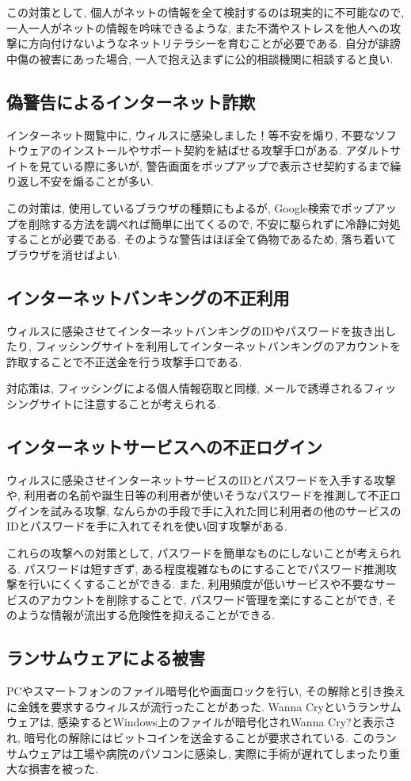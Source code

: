 \documentclass{jsarticle}
\begin{document}
この対策として, 個人がネットの情報を全て検討するのは現実的に不可能なので, 一人一人がネットの情報を吟味できるような, また不満やストレスを他人への攻撃に方向付けないようなネットリテラシーを育むことが必要である. 自分が誹謗中傷の被害にあった場合, 一人で抱え込まずに公的相談機関に相談すると良い.

\subsection{偽警告によるインターネット詐欺}
インターネット閲覧中に, ウィルスに感染しました！等不安を煽り, 不要なソフトウェアのインストールやサポート契約を結ばせる攻撃手口がある. アダルトサイトを見ている際に多いが, 警告画面をポップアップで表示させ契約するまで繰り返し不安を煽ることが多い.

この対策は, 使用しているブラウザの種類にもよるが, Google検索でポップアップを削除する方法を調べれば簡単に出てくるので, 不安に駆られずに冷静に対処することが必要である. そのような警告はほぼ全て偽物であるため, 落ち着いてブラウザを消せばよい.

\subsection{インターネットバンキングの不正利用}
ウィルスに感染させてインターネットバンキングのIDやパスワードを抜き出したり, フィッシングサイトを利用してインターネットバンキングのアカウントを詐取することで不正送金を行う攻撃手口である.

対応策は, フィッシングによる個人情報窃取と同様, メールで誘導されるフィッシングサイトに注意することが考えられる.

\subsection{インターネットサービスへの不正ログイン}
ウィルスに感染させインターネットサービスのIDとパスワードを入手する攻撃や, 利用者の名前や誕生日等の利用者が使いそうなパスワードを推測して不正ログインを試みる攻撃, なんらかの手段で手に入れた同じ利用者の他のサービスのIDとパスワードを手に入れてそれを使い回す攻撃がある.

これらの攻撃への対策として, パスワードを簡単なものにしないことが考えられる. パスワードは短すぎず, ある程度複雑なものにすることでパスワード推測攻撃を行いにくくすることができる. また, 利用頻度が低いサービスや不要なサービスのアカウントを削除することで, パスワード管理を楽にすることができ, そのような情報が流出する危険性を抑えることができる.

\subsection{ランサムウェアによる被害}
PCやスマートフォンのファイル暗号化や画面ロックを行い, その解除と引き換えに金銭を要求するウィルスが流行ったことがあった. Wanna Cryというランサムウェアは, 感染するとWindows上のファイルが暗号化されWanna Cry?と表示され, 暗号化の解除にはビットコインを送金することが要求されている. このランサムウェアは工場や病院のパソコンに感染し, 実際に手術が遅れてしまったり重大な損害を被った.
\end{document}
